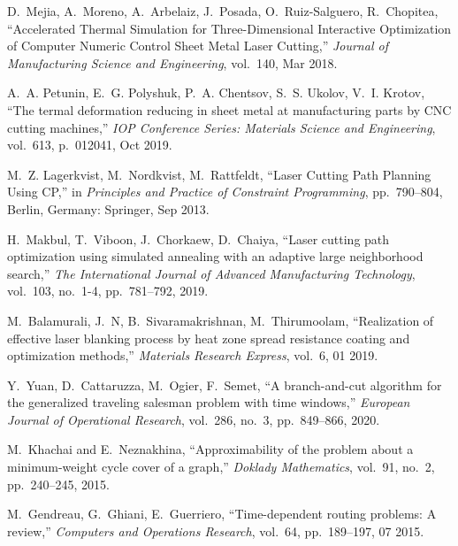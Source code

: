   \item
  D.~Mejia, A.~Moreno, A.~Arbelaiz, J.~Posada, O.~Ruiz-Salguero, R.~Chopitea,
    ``{Accelerated Thermal Simulation for Three-Dimensional Interactive
    Optimization of Computer Numeric Control Sheet Metal Laser Cutting},'' {\em
    Journal of Manufacturing Science and Engineering}, vol.~140, Mar 2018.

  \item
  A.~A. Petunin, E.~G. Polyshuk, P.~A. Chentsov, S.~S. Ukolov, V.~I. Krotov,
    ``{The termal deformation reducing in sheet metal at manufacturing parts by
    {CNC} cutting machines},'' {\em IOP Conference Series: Materials Science and
    Engineering}, vol.~613, p.~012041, Oct 2019.

  \item
  M.~Z. Lagerkvist, M.~Nordkvist, M.~Rattfeldt, ``{Laser Cutting Path
    Planning Using CP},'' in {\em {Principles and Practice of Constraint
    Programming}}, pp.~790--804, Berlin, Germany: Springer, Sep 2013.

  \item
  H.~Makbul, T.~Viboon, J.~Chorkaew, D.~Chaiya, ``Laser cutting path
    optimization using simulated annealing with an adaptive large neighborhood
    search,'' {\em The International Journal of Advanced Manufacturing
    Technology}, vol.~103, no.~1-4, pp.~781--792, 2019.

  \item
  M.~Balamurali, J.~N, B.~Sivaramakrishnan, M.~Thirumoolam, ``Realization of
    effective laser blanking process by heat zone spread resistance coating and
    optimization methods,'' {\em Materials Research Express}, vol.~6, 01 2019.

  \item
  Y.~Yuan, D.~Cattaruzza, M.~Ogier, F.~Semet, ``A branch-and-cut algorithm
    for the generalized traveling salesman problem with time windows,'' {\em
    European Journal of Operational Research}, vol.~286, no.~3, pp.~849--866,
    2020.

  \item
  M.~Khachai and E.~Neznakhina, ``Approximability of the problem about a
    minimum-weight cycle cover of a graph,'' {\em Doklady Mathematics}, vol.~91,
    no.~2, pp.~240--245, 2015.

  \item
  M.~Gendreau, G.~Ghiani, E.~Guerriero, ``Time-dependent routing problems: A
    review,'' {\em Computers and Operations Research}, vol.~64, pp.~189--197, 07
    2015.

